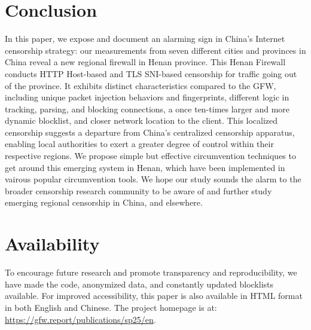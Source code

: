 \documentclass[conference,compsoc]{IEEEtran}
\begin{document}
\section{Conclusion}

In this paper,
we expose and document an alarming sign in China's Internet censorship strategy:
our measurements from seven different cities and provinces in China
reveal a new regional firewall in Henan province.
This Henan Firewall conducts HTTP Host-based and TLS SNI-based censorship
for traffic going out of the province.
It exhibits distinct characteristics compared to the GFW,
including unique packet injection behaviors and fingerprints,
different logic in tracking, parsing, and blocking connections,
a once ten-times larger and more dynamic blocklist,
and closer network location to the client.
This localized censorship suggests a departure from China's centralized
censorship apparatus, enabling local authorities to exert a greater degree of
control within their respective regions.
We propose simple but effective circumvention techniques to get around
this emerging system in Henan,
which have been implemented in vairous popular circumvention tools.
We hope our study sounds the alarm to the
broader censorship research community to be aware of and further study
emerging regional censorship in China, and elsewhere.



\section*{Availability}
To encourage future research and promote transparency and reproducibility,
we have made the code, anonymized data, and constantly updated blocklists available.
For improved accessibility,
this paper is also available in HTML format in both English and Chinese.
The project homepage is at: \url{https://gfw.report/publications/sp25/en}.


\end{document}
